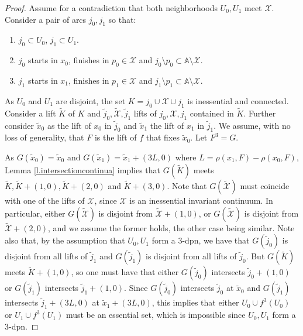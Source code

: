 \documentclass[12pt,a4paper]{amsart}
\theoremstyle{definition}
\theoremstyle{remark}
\newcommand{\A}{\mathbb{A}}
\begin{document}
\begin{proof}%
Assume for a contradiction that both neighborhoods $U_0,U_1$ meet $\mathcal{X}$.
Consider a pair of arcs $j_0, j_1$ so that:

\begin{enumerate}
\item $j_0\subset U_0$, $j_1\subset U_1$.
\item $j_0$ starts in $x_0$, finishes in $p_0\in\mathcal{X}$ and
$j_0\setminus p_0\subset \A\setminus\mathcal{X}$.
\item $j_1$ starts in $x_1$, finishes in $p_1\in\mathcal{X}$ and
$j_1\setminus p_1\subset \A\setminus\mathcal{X}$.
\end{enumerate}

As $U_0$ and $U_1$ are disjoint, the set
$K=j_0\cup \mathcal{X}\cup j_1$ is inessential and connected. Consider a lift
$\widetilde{K}$ of $K$ and $\widetilde{j}_0,\widetilde{\mathcal{X}},\widetilde{j}_1$ lifts
of $j_0,\mathcal{X},j_1$ contained in $\widetilde{K}$. Further consider $\widetilde{x}_0$
as the lift of $x_0$ in $\widetilde{j}_0$ and $\widetilde{x}_1$ the lift of $x_1$
in $\widetilde{j}_1$. We assume, with no loss of generality, that $F$ is the lift of $f$ that fixes $\widetilde{x}_0$. Let $F^3=G$.

As $G(\widetilde{x}_0)=\widetilde{x}_0$ and
$G(\widetilde{x}_1)=\widetilde{x}_1+(3L,0)$ where $L=\rho(x_1,F)-\rho(x_0,F)$, Lemma \ref{l.intersectioncontinua}
implies that $G(\widetilde{K})$ meets $\widetilde{K},\widetilde{K}+(1,0),\widetilde{K}+(2,0)$ and $\widetilde{K}+(3,0)$. Note that $G(\widetilde{\mathcal{X}})$ must coincide with one of the lifts of $\mathcal{X}$, since $\mathcal{X}$ is an inessential invariant continuum. In particular, either $G(\widetilde{\mathcal{X}})$ is disjoint from $\widetilde{\mathcal{X}}+(1,0)$, or $G(\widetilde{\mathcal{X}})$ is disjoint from $\widetilde{\mathcal{X}}+(2,0)$, and we assume the former holds, the other case being similar. Note also that, by the assumption that $U_0, U_1$ form a $3$-dpn, we have that $G(\widetilde{j}_0)$ is disjoint from all lifts of $\widetilde{j}_1$ and $G(\widetilde{j}_1)$ is disjoint from all lifts of $\widetilde{j}_0$. But $G(\widetilde{K})$ meets $\widetilde{K}+(1,0)$, so one must have that either $G(\widetilde{j}_0)$ intersects $\widetilde{j}_0+(1,0)$ or  $G(\widetilde{j}_1)$ intersects $\widetilde{j}_1+(1,0)$. Since  $G(\widetilde{j}_0)$ intersects $\widetilde{j}_0$ at $\widetilde{x}_0$ and $G(\widetilde{j}_1)$ intersects $\widetilde{j}_1+(3L,0)$ at $\widetilde{x}_1+(3L,0)$, this implies that either $U_0\cup f^3(U_0)$ or $U_1\cup f^3(U_1)$ must be  an essential set, which is impossible since $U_0, U_1$ form a $3$-dpn.
\end{proof}
\end{document}

